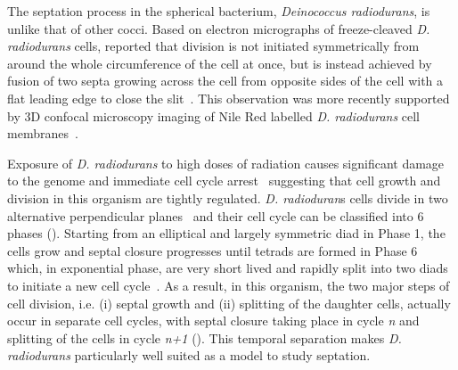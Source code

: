 The septation process in the spherical bacterium, \textit{Deinococcus radiodurans}, is unlike that of other cocci.
Based on electron micrographs of freeze-cleaved \textit{D. radiodurans} cells, \citet{murrayCellDivisionDeinococcus1983} reported that division is not initiated symmetrically from around the whole circumference of the cell at once, but is instead achieved by fusion of two septa growing across the cell from opposite sides of the cell with a flat leading edge to close the slit~\cite{murrayCellDivisionDeinococcus1983}.
This observation was more recently supported by 3D confocal microscopy imaging of Nile Red labelled \textit{D. radiodurans} cell membranes~\cite{flochCellMorphologyNucleoid2019}.

Exposure of \textit{D. radiodurans} to high doses of radiation causes significant damage to the genome and immediate cell cycle arrest~\cite{zahradkaReassemblyShatteredChromosomes2006} suggesting that cell growth and division in this organism are tightly regulated.
\textit{D. radioduran}s cells divide in two alternative perpendicular planes~\cite{murrayCellDivisionDeinococcus1983,thornleyFineStructureMicrococcus1965} and their cell cycle can be classified into 6 phases ().
Starting from an elliptical and largely symmetric diad in Phase 1, the cells grow and septal closure progresses until tetrads are formed in Phase 6 which, in exponential phase, are very short lived and rapidly split into two diads to initiate a new cell cycle~\cite{flochCellMorphologyNucleoid2019}.
As a result, in this organism, the two major steps of cell division, i.e. (i) septal growth and (ii) splitting of the daughter cells, actually occur in separate cell cycles, with septal closure taking place in cycle \textit{n} and splitting of the cells in cycle \textit{n+1} ().
This temporal separation makes \textit{D. radiodurans} particularly well suited as a model to study septation.

